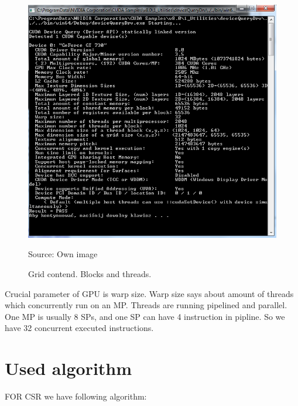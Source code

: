 \documentclass{scrreprt}
\begin{document}
\begin{figure}[h!]
\centering
\includegraphics{CUDAParam.PNG}
\caption{Grid contend. Blocks and threads.}
Source: Own image
\end{figure}
\FloatBarrier


Crucial parameter of GPU is warp size. Warp size says about amount of threads which concurrently run on an MP. Threads are running pipelined and parallel. One MP is usually 8 SPs, and one SP can have 4 instruction in pipline. So we have 32 concurrent executed instructions.

\section{Used algorithm}

FOR CSR we have following algorithm:
\end{document}
